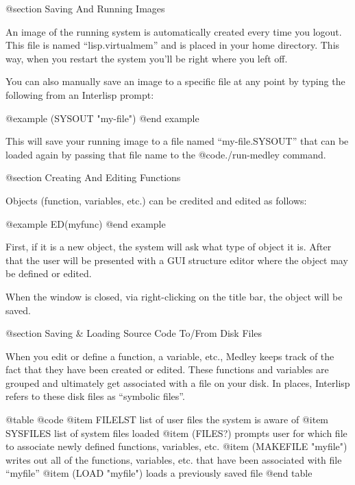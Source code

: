 @section Saving And Running Images

An image of the running system is automatically created every time you
logout.  This file is named ``lisp.virtualmem'' and is placed in your
home directory.  This way, when you restart the system you'll be right
where you left off.

You can also manually save an image to a specific file at any point by
typing the following from an Interlisp prompt:

@example
(SYSOUT "my-file")
@end example

This will save your running image to a file named ``my-file.SYSOUT''
that can be loaded again by passing that file name to the
@code{./run-medley} command.

@section Creating And Editing Functions

Objects (function, variables, etc.) can be credited and edited
as follows:

@example
ED(myfunc)
@end example

First, if it is a new object, the system will ask what type of object
it is.  After that the user will be presented with a GUI structure editor
where the object may be defined or edited.

When the window is closed, via right-clicking on the title bar,
the object will be saved.



@section Saving & Loading Source Code To/From Disk Files

When you edit or define a function, a variable, etc., Medley keeps
track of the fact that they have been created or edited.  These
functions and variables are grouped and ultimately get associated with
a file on your disk.  In places, Interlisp refers to these disk files
as ``symbolic files''.

@table @code
@item FILELST
list of user files the system is aware of
@item SYSFILES
list of system files loaded
@item (FILES?)
prompts user for which file to associate newly defined functions,
variables, etc.
@item (MAKEFILE "myfile")
writes out all of the functions, variables, etc. that have been
associated with file ``myfile''
@item (LOAD "myfile")
loads a previously saved file
@end table
